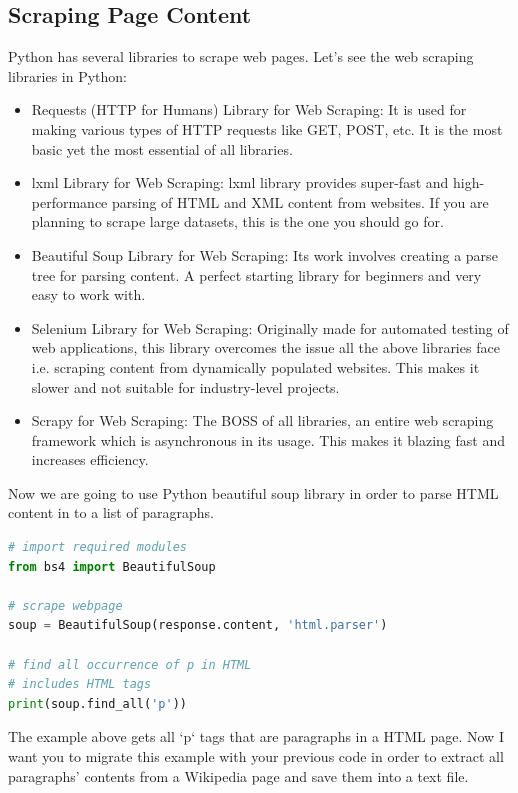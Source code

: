 \documentclass{article}
\begin{document}
\subsection{Scraping Page Content}
Python has several libraries to scrape web pages. Let's see the web scraping libraries in Python:

\begin{itemize}
    \item Requests (HTTP for Humans) Library for Web Scraping: It is used for making various types of HTTP requests like GET, POST, etc. It is the most basic yet the most essential of all libraries.
    \item lxml Library for Web Scraping: lxml library provides super-fast and high-performance parsing of HTML and XML content from websites. If you are planning to scrape large datasets, this is the one you should go for.
    \item Beautiful Soup Library for Web Scraping: Its work involves creating a parse tree for parsing content. A perfect starting library for beginners and very easy to work with.
    \item Selenium Library for Web Scraping: Originally made for automated testing of web applications, this library overcomes the issue all the above libraries face i.e. scraping content from dynamically populated websites. This makes it slower and not suitable for industry-level projects.
    \item Scrapy for Web Scraping: The BOSS of all libraries, an entire web scraping framework which is asynchronous in its usage. This makes it blazing fast and increases efficiency.
\end{itemize}

Now we are going to use Python beautiful soup library in order to parse HTML content in to a list of paragraphs.

\begin{lstlisting}[language=Python, caption=Example of using BS4 library]
# import required modules
from bs4 import BeautifulSoup

# scrape webpage
soup = BeautifulSoup(response.content, 'html.parser')
 
# find all occurrence of p in HTML
# includes HTML tags
print(soup.find_all('p'))
\end{lstlisting}

The example above gets all `p` tags that are paragraphs in a HTML page. Now I want you to migrate
this example with your previous code in order to extract all paragraphs' contents from a Wikipedia page
and save them into a text file.
\end{document}
